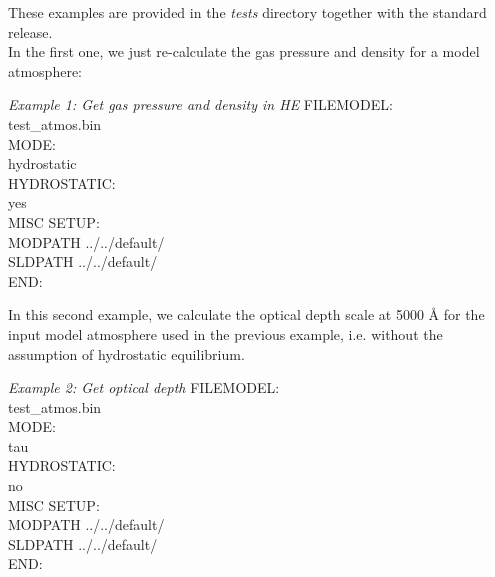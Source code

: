 %

These examples are provided in the {\it tests} directory together with the standard release.\\

In the first one, we just re-calculate the gas pressure and density for a model atmosphere:

\begin{ifbox}[label={tb:example01}]{{\it Example 1: Get gas pressure and density in HE}}
  \scriptsize
FILEMODEL:\\
test\_atmos.bin\\
MODE:\\
hydrostatic\\
HYDROSTATIC:\\
yes\\
MISC SETUP:\\
MODPATH ../../default/\\
SLDPATH ../../default/\\
END:
  \normalsize
\end{ifbox}


%

In this second example, we calculate the optical depth scale at 5000 {\AA} for the input model atmosphere used in the previous example, i.e. without the assumption of hydrostatic equilibrium.\\

\begin{ifbox}[label={tb:example02}]{{\it Example 2: Get optical depth}}
  \scriptsize
FILEMODEL:\\
test\_atmos.bin\\
MODE:\\
tau\\
HYDROSTATIC:\\
no\\
MISC SETUP:\\
MODPATH ../../default/\\
SLDPATH ../../default/\\
END:
  \normalsize
\end{ifbox}


